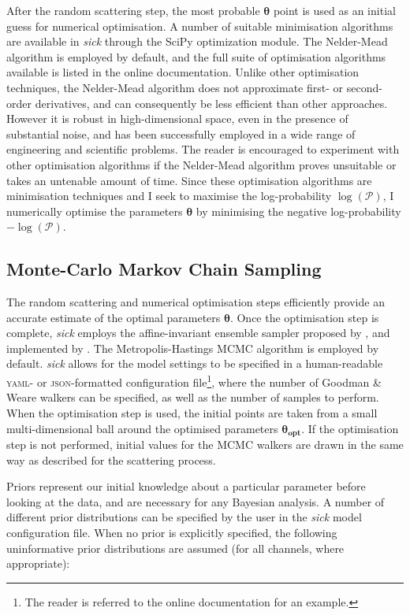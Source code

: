 \documentclass{aastex}
\newcommand{\sick}{\textit{sick}}
\begin{document}
After the random scattering step, the most probable $\bm{\theta}$ point is used 
as an initial guess for numerical optimisation. A number of suitable minimisation 
algorithms are available in \sick{} through the SciPy \citep{scipy} optimization 
module. The Nelder-Mead algorithm \citep{nelder-mead} is employed by default, and 
the full suite of optimisation algorithms available is listed in the online 
documentation. Unlike other optimisation techniques, the Nelder-Mead algorithm 
does not approximate first- or second-order derivatives, and can consequently be 
less efficient than other approaches. However it is robust in high-dimensional 
space, even in the presence of substantial noise, and has been successfully 
employed in a wide range of engineering and scientific problems. The reader is 
encouraged to experiment with other optimisation algorithms if the Nelder-Mead 
algorithm proves unsuitable or takes an untenable amount of time. Since these 
optimisation algorithms are minimisation techniques and I seek to maximise the 
log-probability $\log{\left(\mathcal{P}\right)}$, I numerically optimise the 
parameters $\bm{\theta}$ by minimising the negative log-probability 
$-\log{\left(\mathcal{P}\right)}$.

\subsection{Monte-Carlo Markov Chain Sampling}
\label{sec:mcmc}

The random scattering and numerical optimisation steps efficiently provide an 
accurate estimate of the optimal parameters $\bm{\theta}$. Once the optimisation
 step is complete, \sick{} employs the affine-invariant ensemble sampler proposed 
 by \citet{goodman;weare}, and implemented by \citet{emcee}. The Metropolis-Hastings 
 MCMC algorithm is employed by default. \sick{} allows for the model settings to 
 be specified in a human-readable \textsc{yaml}- or \textsc{json}-formatted 
 configuration file\footnote{The reader is referred to the online documentation 
 for an example.}, where the number of Goodman \& Weare walkers can be specified, 
 as well as the number of samples to perform. When the optimisation step is used, 
 the initial points are taken from a small multi-dimensional ball around the 
 optimised parameters $\bm{\theta_{opt}}$. If the optimisation step is not 
 performed, initial values for the MCMC walkers are drawn in the same way as 
 described for the scattering process. 

Priors represent our initial knowledge about a particular parameter before 
looking at the data, and are necessary for any Bayesian analysis. A number of 
different prior distributions can be specified by the user in the \sick{} model 
configuration file. When no prior is explicitly specified, the following 
uninformative prior distributions are assumed (for all channels, where appropriate):
\end{document}
